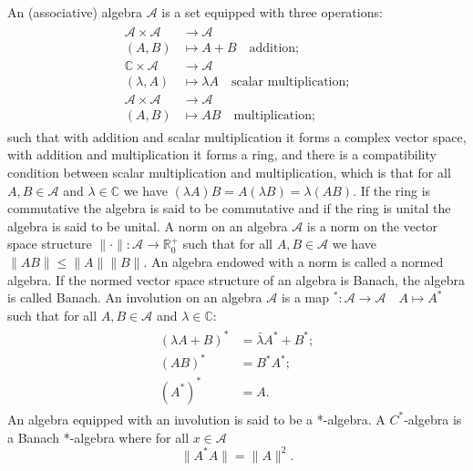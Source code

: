 \begin{definition}
An (associative) algebra $\mathcal{A}$ is a set equipped with three operations:
\begin{align}
\begin{split}
 \mathcal{A} \times \mathcal{A} & \rightarrow  \mathcal{A} \\
 (A,B) & \mapsto  A+B \quad\text{addition;}  \\
 \mathbb{C} \times \mathcal{A} & \rightarrow \mathcal{A} \\
 (\lambda,A) & \mapsto \lambda A \quad\text{scalar multiplication;} \\
 \mathcal{A} \times \mathcal{A} & \rightarrow \mathcal{A} \\
 (A, B) & \mapsto AB \quad\text{multiplication;}
\end{split}
\end{align}
such that with addition and scalar multiplication it forms a complex vector space, with addition and multiplication it forms a ring, and there is a compatibility condition between scalar multiplication and multiplication, which is that for all $A,B\in\mathcal{A}$ and $\lambda\in\mathbb{C}$ we have $(\lambda A)B=A(\lambda B) = \lambda (AB)$. If the ring is commutative the algebra is said to be commutative and if the ring is unital the algebra is said to be unital. A norm on an algebra $\mathcal{A}$ is a norm on the vector space structure $\|\cdot\|:\mathcal{A} \rightarrow \mathbb{R}^{+}_0 $ such that for all $A,B\in\mathcal{A}$ we have $\|AB\|\leq\|A\|\|B\|$. An algebra endowed with a norm is called a normed algebra. If the normed vector space structure of an algebra is Banach, the algebra is called Banach. An involution on an algebra $\mathcal{A}$ is a map $^*:\mathcal{A}  \rightarrow \mathcal{A} \quad A \mapsto A^*$ such that for all $A,B\in\mathcal{A}$ and $\lambda\in\mathbb{C}$:
\begin{align}
\begin{split}
(\lambda A + B)^*&=\bar{\lambda}A^* + B^*; \\
(AB)^*&=B^*A^*;\\
(A^*)^*&=A.
\end{split}
\end{align}
An algebra equipped with an involution is said to be a *-algebra. A $C^*$-algebra is a Banach *-algebra where for all $x\in\mathcal{A}$ 
\begin{equation}
\|A^*A\|=\|A\|^2.
\end{equation}
\end{definition}

